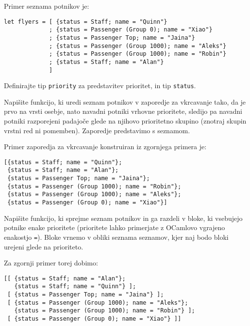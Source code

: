 \documentclass[arhiv]{../izpit}
\begin{document}
Primer seznama potnikov je:
\begin{verbatim}
let flyers = [ {status = Staff; name = "Quinn"}
             ; {status = Passenger (Group 0); name = "Xiao"}
             ; {status = Passenger Top; name = "Jaina"}
             ; {status = Passenger (Group 1000); name = "Aleks"}
             ; {status = Passenger (Group 1000); name = "Robin"}
             ; {status = Staff; name = "Alan"}
             ]
\end{verbatim}
%
Definirajte tip \verb|priority| za predstavitev prioritet, in tip \verb|status|.

\naloga

Napišite funkcijo, ki uredi seznam potnikov v zaporedje za vkrcavanje tako, da
je prvo na vrsti osebje, nato navadni potniki vrhovne prioritete, sledijo pa navadni potniki
razporejeni padajoče glede na njihovo prioritetno skupino (znotraj skupin vrstni 
red ni pomemben). Zaporedje predstavimo s seznamom.

Primer zaporedja za vkrcavanje konstruiran iz zgornjega primera je:

\begin{verbatim}
[{status = Staff; name = "Quinn"};
 {status = Staff; name = "Alan"};
 {status = Passenger Top; name = "Jaina"};
 {status = Passenger (Group 1000); name = "Robin"};
 {status = Passenger (Group 1000); name = "Aleks"};
 {status = Passenger (Group 0); name = "Xiao"}]
\end{verbatim}

\naloga

Napišite funkcijo, ki sprejme seznam potnikov in ga razdeli v bloke, ki vsebujejo
potnike enake prioritete (prioritete lahko primerjate z OCamlovo vgrajeno enakostjo \verb|=|).
Bloke vrnemo v obliki seznama seznamov, kjer naj bodo bloki urejeni glede na prioriteto.

Za zgornji primer torej dobimo:
%
\begin{verbatim}
[[ {status = Staff; name = "Alan"}; 
   {status = Staff; name = "Quinn"} ];
 [ {status = Passenger Top; name = "Jaina"} ];
 [ {status = Passenger (Group 1000); name = "Aleks"};
   {status = Passenger (Group 1000); name = "Robin"} ];
 [ {status = Passenger (Group 0); name = "Xiao"} ]]
\end{verbatim}
\end{document}
